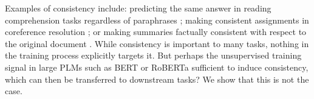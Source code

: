 Examples of consistency include: predicting the same answer in reading comprehension tasks regardless of paraphrases \cite{consistent-qa}; making consistent assignments in coreference resolution \cite{denis2009global,chang2011inference}; or making summaries factually consistent with respect to the original document \cite{kryscinski2020evaluating}.
While consistency is important to many tasks, nothing in the training process explicitly targets it. But perhaps the unsupervised training signal in large PLMs such as BERT or RoBERTa \cite{bert,roberta}  sufficient to induce consistency, which can then be transferred to downstream tasks? 
We show that this is not the case.


